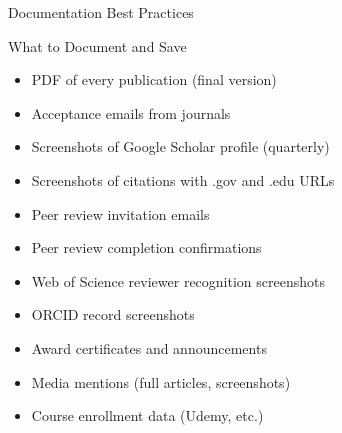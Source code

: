 \documentclass[11pt]{beamer}
\begin{document}
				\begin{frame}{Documentation Best Practices}
					\scriptsize
					\begin{block}{What to Document and Save}
						\begin{itemize}
							\item [$\square$] PDF of every publication (final version)
							\item [$\square$] Acceptance emails from journals
							\item [$\square$] Screenshots of Google Scholar profile (quarterly)
							\item [$\square$] Screenshots of citations with .gov and .edu URLs
							\item [$\square$] Peer review invitation emails
							\item [$\square$] Peer review completion confirmations
							\item [$\square$] Web of Science reviewer recognition screenshots
							\item [$\square$] ORCID record screenshots
							\item [$\square$] Award certificates and announcements
							\item [$\square$] Media mentions (full articles, screenshots)
							\item [$\square$] Course enrollment data (Udemy, etc.)
						\end{itemize}
					\end{block}
				\end{frame}
				
\end{document}
